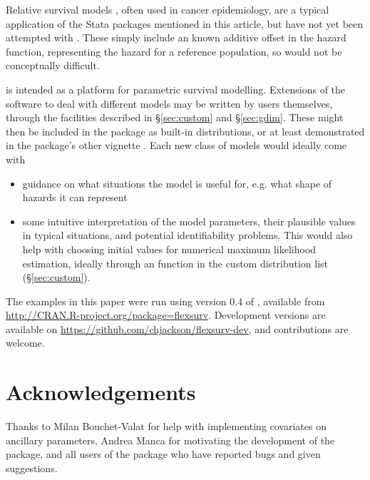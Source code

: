 \documentclass[nojss,nofooter]{jss}
\begin{document}
Relative survival models \citep{nelson:relative:survival}, often used
in cancer epidemiology, are a typical application of the Stata
packages mentioned in this article, but have not yet been attempted
with .  These simply include an known additive offset in
the hazard function, representing the hazard for a reference
population, so would not be conceptually difficult.

 is intended as a platform for parametric survival
modelling.  Extensions of the software to deal with different models
may be written by users themselves, through the facilities described
in \S\ref{sec:custom} and \S\ref{sec:gdim}.  These might then be
included in the package as built-in distributions, or at least demonstrated
in the package's other vignette . Each
new class of models would ideally come with
\begin{itemize}
\item guidance on what situations the model is useful for, e.g. what
  shape of hazards it can represent

\item some intuitive interpretation of the model parameters, their
  plausible values in typical situations, and potential
  identifiability problems. This would also help with choosing initial
  values for numerical maximum likelihood estimation, ideally through
  an  function in the custom distribution list
  (\S\ref{sec:custom}).
\end{itemize}

The examples in this paper were run using version 0.4 of , available from \url{http://CRAN.R-project.org/package=flexsurv}.  Development versions are available on \url{https://github.com/chjackson/flexsurv-dev}, and contributions are welcome.

\appendix
\section{Acknowledgements}
Thanks to Milan Bouchet-Valat for help with implementing covariates on
ancillary parameters, Andrea Manca for motivating the development of
the package, and all users of the package who have reported bugs and
given suggestions.


\end{document}
